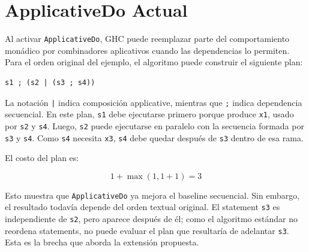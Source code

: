 
\section{ApplicativeDo Actual}

Al activar \texttt{ApplicativeDo}, \textsf{GHC} puede reemplazar parte del comportamiento monádico por combinadores aplicativos cuando las dependencias lo permiten. Para el orden original del ejemplo, el algoritmo puede construir el siguiente plan:

\begin{verbatim}
s1 ; (s2 | (s3 ; s4))
\end{verbatim}

La notación \verb!|! indica composición applicative, mientras que \verb|;| indica dependencia secuencial. En este plan, \texttt{s1} debe ejecutarse primero porque produce \texttt{x1}, usado por \texttt{s2} y \texttt{s4}. Luego, \texttt{s2} puede ejecutarse en paralelo con la secuencia formada por \texttt{s3} y \texttt{s4}. Como \texttt{s4} necesita \texttt{x3}, \texttt{s4} debe quedar después de \texttt{s3} dentro de esa rama.

El costo del plan es:

\[
1 + \max(1, 1 + 1) = 3
\]

Esto muestra que \texttt{ApplicativeDo} ya mejora el baseline secuencial. Sin embargo, el resultado todavía depende del orden textual original. El statement \texttt{s3} es independiente de \texttt{s2}, pero aparece después de él; como el algoritmo estándar no reordena statements, no puede evaluar el plan que resultaría de adelantar \texttt{s3}. Esta es la brecha que aborda la extensión propuesta.
